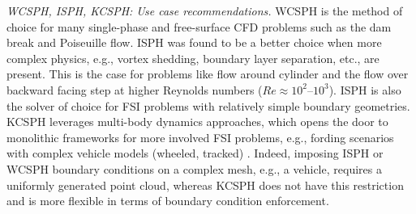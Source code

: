 \vspace{3pt}

\noindent \textit{WCSPH, ISPH, KCSPH: Use case recommendations.}
WCSPH is the method of choice for many single-phase and free-surface CFD problems such as the dam break and Poiseuille flow. ISPH was found to be a better choice when more complex physics, e.g., vortex shedding, boundary layer separation, etc., are present. This is the case for problems like flow around cylinder and the flow over backward facing step at higher Reynolds numbers ($Re\approx 10^2$--$10^3$). ISPH is also the solver of choice for FSI problems with relatively simple boundary geometries. KCSPH leverages multi-body dynamics approaches, which opens the door to monolithic frameworks for more involved FSI problems, e.g., fording scenarios with complex vehicle models (wheeled, tracked) \cite{hammadConstrFluid2018}. Indeed, imposing ISPH or WCSPH boundary conditions on a complex mesh, e.g., a vehicle, requires a uniformly generated point cloud, whereas KCSPH does not have this restriction and is more flexible in terms of boundary condition enforcement. 

%





